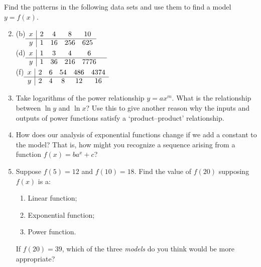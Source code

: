 \begin{exercises}{}{}
\exstart Find the patterns in the following data sets and use them to find a model $y=f(x)$.
\begin{enumerate}\setcounter{enumi}{1}
  \item[]
		(b)\lstsp$\begin{array}[t]{c|cccc}
		x&2&4&8&10\\\hline
		y&1&16&256&625
		\end{array}$\\[5pt]
		(d)\lstsp$\begin{array}[t]{c|ccccc}
		x&1&3&4&6\\\hline
		y&1&36&216&7776&
		\end{array}$\\[5pt]
		(f)\lstsp $\begin{array}[t]{c|ccccc}
		x&2&6&54&486&4374\\\hline
		y&2&4&8&12&16
		\end{array}$


	\item Take logarithms of the power relationship $y=ax^m$. What is the relationship between $\ln y$ and $\ln x$? Use this to give another reason why the inputs and outputs of power functions satisfy a `product--product' relationship.
	
	\item How does our analysis of exponential functions change if we add a constant to the model? That is, how might you recognize a sequence arising from a function $f(x)=ba^x+c$?
  
  \item Suppose $f(5)=12$ and $f(10)=18$. Find the value of $f(20)$ supposing $f(x)$ is a:
  \begin{enumerate}
    \item Linear function;
    \item Exponential function;
    \item Power function.
  \end{enumerate}
  If $f(20)=39$, which of the three \emph{models} do you think would be more appropriate?
\end{enumerate}
\end{exercises}
